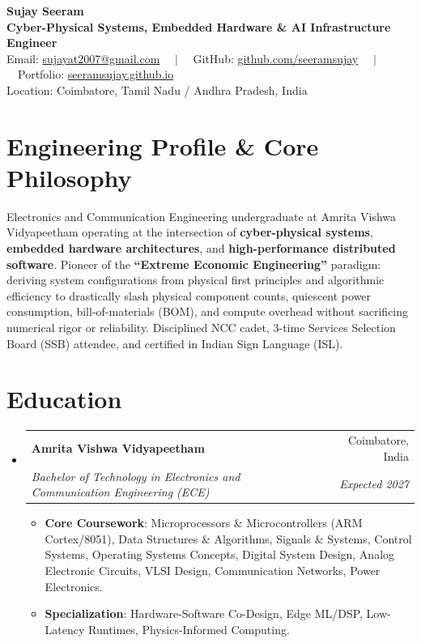 \documentclass[letterpaper,10pt]{article}
\makeatletter
\newcommand{\resumeSubheading}[4]{
  \vspace{-2pt}\item
    \begin{tabular*}{\linewidth}[t]{l@{\extracolsep{\fill}}r}
      \textbf{#1} & #2 \\
      \textit{\small#3} & \textit{\small #4} \\
    \end{tabular*}\vspace{-3pt}
}
\newcommand{\resumeSubHeadingListStart}{\begin{itemize}[leftmargin=*]}
\newcommand{\resumeSubHeadingListEnd}{\end{itemize}}
\newcommand{\resumeItemListStart}{\begin{itemize}[leftmargin=14pt, labelsep=4pt, itemsep=0.5pt, parsep=0pt]}
\newcommand{\resumeItemListEnd}{\end{itemize}\vspace{-3pt}}
\makeatother
\begin{document}
\begin{center}
  {\Huge \textbf{Sujay Seeram}} \\ \vspace{3pt}
  \textbf{Cyber-Physical Systems, Embedded Hardware \& AI Infrastructure Engineer} \\ \vspace{3pt}
  \small Email: \href{mailto:sujayat2007@gmail.com}{sujayat2007@gmail.com} \ \ $|$ \ \ 
  GitHub: \href{https://github.com/seeramsujay}{github.com/seeramsujay} \ \ $|$ \ \ 
  Portfolio: \href{https://seeramsujay.github.io}{seeramsujay.github.io} \\ \vspace{1pt}
  \footnotesize Location: Coimbatore, Tamil Nadu / Andhra Pradesh, India
\end{center}

\vspace{-4pt}
\section{Engineering Profile \& Core Philosophy}
\vspace{1pt}
\small{
Electronics and Communication Engineering undergraduate at Amrita Vishwa Vidyapeetham operating at the intersection of \textbf{cyber-physical systems}, \textbf{embedded hardware architectures}, and \textbf{high-performance distributed software}. Pioneer of the \textbf{``Extreme Economic Engineering''} paradigm: deriving system configurations from physical first principles and algorithmic efficiency to drastically slash physical component counts, quiescent power consumption, bill-of-materials (BOM), and compute overhead without sacrificing numerical rigor or reliability. Disciplined NCC cadet, 3-time Services Selection Board (SSB) attendee, and certified in Indian Sign Language (ISL).
}

\section{Education}
  \resumeSubHeadingListStart
    \resumeSubheading
      {Amrita Vishwa Vidyapeetham}{Coimbatore, India}
      {Bachelor of Technology in Electronics and Communication Engineering (ECE)}{Expected 2027}
      \resumeItemListStart
        \item{\textbf{Core Coursework}: Microprocessors \& Microcontrollers (ARM Cortex/8051), Data Structures \& Algorithms, Signals \& Systems, Control Systems, Operating Systems Concepts, Digital System Design, Analog Electronic Circuits, VLSI Design, Communication Networks, Power Electronics.}
        \item{\textbf{Specialization}: Hardware-Software Co-Design, Edge ML/DSP, Low-Latency Runtimes, Physics-Informed Computing.}
      \resumeItemListEnd
  \resumeSubHeadingListEnd
\end{document}
